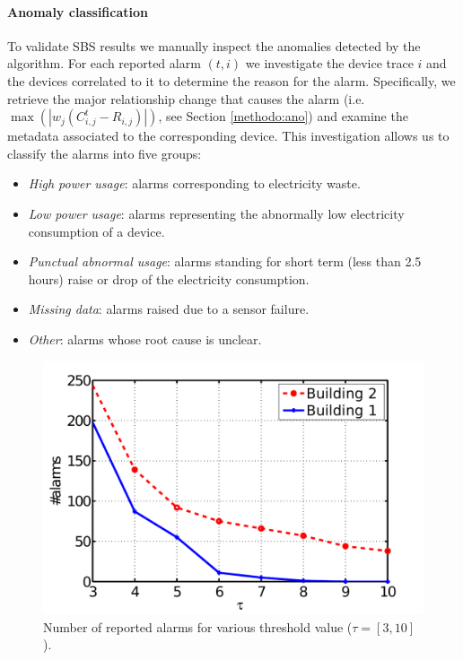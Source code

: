 \paragraph{Anomaly classification}
To validate SBS results we manually inspect the anomalies detected by the algorithm.  
For each reported alarm $(t,i)$ we investigate the device trace $i$ and the devices correlated to it
to determine the reason for the alarm.
Specifically, we retrieve the major relationship change that causes the alarm (i.e. $\max(|w_j(C_{i,j}^t - R_{i,j})|)$, 
see Section \ref{methodo:ano}) and examine the metadata associated to the corresponding device.
This investigation allows us to classify the alarms into five groups:
\begin{itemize}
 \item \emph{High power usage}: alarms corresponding to electricity waste.
 \item \emph{Low power usage}: alarms representing the abnormally low electricity consumption of a device.
 \item \emph{Punctual abnormal usage}: alarms standing for short term (less than 2.5 hours) raise or drop of the electricity consumption.
 \item \emph{Missing data}: alarms raised due to a sensor failure.
 \item \emph{Other}: alarms whose root cause is unclear.
\end{itemize}


\begin{figure}
\begin{center}
 \includegraphics[width=.49\textwidth]{img/threshold-eps-converted-to.pdf}
 \caption{Number of reported alarms for various threshold value ($\tau=[3,10]$).}
 \label{fig:thres}
 \end{center}
\end{figure}

